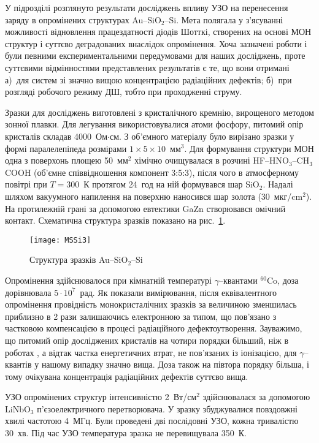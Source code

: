У підрозділі розглянуто результати досліджень впливу УЗО на перенесення заряду в опромінених структурах Au--SiO$_2$--Si.
Мета  полягала у з'ясуванні можливості відновлення працездатності діодів Шотткі, створених на основі МОН структур і суттєво деградованих внаслідок опромінення.
Хоча зазначені роботи \cite{Parchinskii2000r,Parchinskii2006r} і були певними експериментальними передумовами для наших досліджень, проте
суттєвими відмінностями представлених результатів є те, що вони отримані
а)~для систем зі значно вищою концентрацією радіаційних дефектів;
б)~при розгляді робочого режиму ДШ, тобто при проходженні струму.



Зразки для досліджень  виготовлені з кристалічного кремнію, вирощеного методом зонної плавки.
Для легування використовувалися атоми фосфору, питомий опір кристалів складав 4000~Ом$\cdot$см.
З об'ємного матеріалу було вирізано зразки у формі паралелепіпеда розмірами $1\times5\times10$~мм$^3$.
Для формування структури МОН одна з поверхонь площею 50~мм$^2$ хімічно очищувалася в розчині HF--HNO$_3$--CH$_3$COOH (об'ємне співвідношення компонент 3:5:3),
після чого в атмосферному повітрі при $T=300$~К протягом 24~год на ній формувався шар SiO$_2$.
Надалі шляхом вакуумного напилення на поверхню наносився шар золота (30~мкг/cm$^2$).
На протилежній грані за допомогою евтектики GaZn створювався омічний контакт.
Схематична структура зразків показано на рис.~\ref{figMSSi3}.

\begin{figure}[b]
\center
\texttt{[image: MSSi3]}%
\caption{\label{figMSSi3}
Структура зразків Au--SiO$_2$--Si
}
\end{figure}

Опромінення здійснювалося при кімнатній температурі $\gamma$--квантами $^{60}$Co, доза дорівнювала $5\cdot10^7$~рад.
Як показали вимірювання, після еквівалентного опромінення провідність монокристалічних зразків за величиною зменшилась приблизно в 2 рази залишаючись електронною за типом,
що пов'язано з частковою компенсацією в процесі радіаційного дефектоутворення.
Зауважимо, що питомий опір досліджених кристалів на чотири порядки більший, ніж в роботах \cite{Parchinskii2000r,Parchinskii2006r}, а відтак частка енергетичних втрат, не пов'язаних із іонізацією, для $\gamma$--квантів у нашому випадку значно вища.
Доза також на півтора порядку більша, і тому очікувана концентрація радіаційних дефектів суттєво вища.


УЗО опромінених структур інтенсивністю 2~Вт/см$^2$ здійснювалася за допомогою LiNbO$_3$ п'єзоелектричного перетворювача.
У зразку збуджувалися повздовжні хвилі частотою 4~МГц.
Були проведені дві послідовні УЗО, кожна тривалістю 30~хв.
Під час УЗО температура зразка не перевищувала 350~К.

